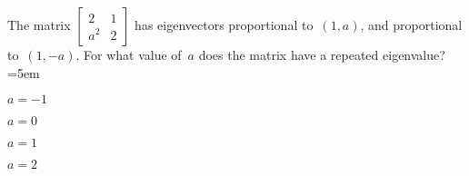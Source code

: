 \begin{activity}
The matrix \(\begin{bmatrix} 2&1\\a^2&2 \end{bmatrix}\) has eigenvectors proportional to~\((1,a)\), and proportional to~\((1,-a)\).
For what value of~\(a\) does the matrix have a repeated eigenvalue?
\partswidth=5em
\begin{parts}
\item \(a=-1\)
\item \(a=0\)\actans
\item \(a=1\)
\item \(a=2\)
\end{parts}
\end{activity}






